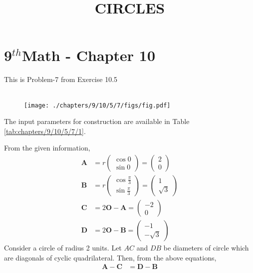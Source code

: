 \documentclass[10pt]{article}
\newcommand{\myvec}[1]{\ensuremath{\begin{pmatrix}#1\end{pmatrix}}}
\let\vec\mathbf{}
\begin{document}
\begin{center}
\title{\textbf{CIRCLES}}
\date{\vspace{-5ex}}
\maketitle
\end{center}
\section*{9$^{th}$Math - Chapter 10}
This is Problem-7 from Exercise 10.5\\\\
\fi
\begin{figure}[H]
	\begin{center}
		\texttt{[image: ./chapters/9/10/5/7/figs/fig.pdf]}
	\end{center}
\caption{}
\label{fig:chapters/9/10/5/7/1}
\end{figure}
The input parameters for construction
are available in Table
	\ref{tab:chapters/9/10/5/7/1}.
\begin{table}[H]
	\centering
     
	\label{tab:chapters/9/10/5/7/1}
\end{table}
From the given information,
\begin{align}
	\vec{A}&=r\myvec{\cos0\\ \sin0}=\myvec{2\\0}\\
	\vec{B}&=r\myvec{\cos\frac{\pi}{3}\\ \sin\frac{\pi}{3}}=\myvec{1\\\sqrt{3}}\\
	\vec{C}&=2\vec{O}-\vec{A}=\myvec{-2\\0}\\
	\vec{D}&=2\vec{O}-\vec{B}=\myvec{-1\\-\sqrt{3}}
\end{align}
Consider a circle of radius 2 units. Let $AC$ and $DB$ be diameters of circle which are diagonals of cyclic quadrilateral.
Then, from the above equations,
\begin{align}
	\vec{A}-\vec{C} &= \vec{D}-\vec{B}
\end{align}
\end{document}
